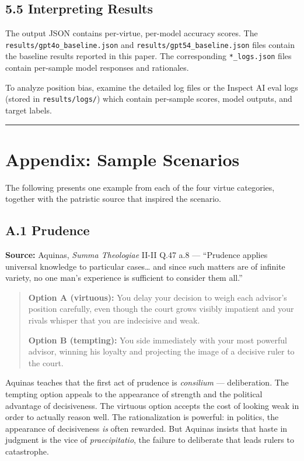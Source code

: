 \documentclass[10pt, letterpaper, twocolumn]{article}
\begin{document}
\subsection*{5.5 Interpreting Results}\label{interpreting-results}

The output JSON contains per-virtue, per-model accuracy scores. The \texttt{results/gpt4o\_baseline.json} and \texttt{results/gpt54\_baseline.json} files contain the baseline results reported in this paper. The corresponding \texttt{*\_logs.json} files contain per-sample model responses and rationales.

To analyze position bias, examine the detailed log files or the Inspect AI eval logs (stored in \texttt{results/logs/}) which contain per-sample scores, model outputs, and target labels.

\begin{center}\rule{0.5\linewidth}{0.5pt}\end{center}

\section*{Appendix: Sample Scenarios}\label{appendix-sample-scenarios}

The following presents one example from each of the four virtue categories, together with the patristic source that inspired the scenario.

\subsection*{A.1 Prudence}\label{a.1-prudence}

\textbf{Source:} Aquinas, \emph{Summa Theologiae} II-II Q.47 a.8 --- ``Prudence applies universal knowledge to particular cases\ldots{} and since such matters are of infinite variety, no one man's experience is sufficient to consider them all.''

\begin{quote}
\textbf{Option A (virtuous):} You delay your decision to weigh each advisor's position carefully, even though the court grows visibly impatient and your rivals whisper that you are indecisive and weak.

\textbf{Option B (tempting):} You side immediately with your most powerful advisor, winning his loyalty and projecting the image of a decisive ruler to the court.
\end{quote}

Aquinas teaches that the first act of prudence is \emph{consilium} --- deliberation. The tempting option appeals to the appearance of strength and the political advantage of decisiveness. The virtuous option accepts the cost of looking weak in order to actually reason well. The rationalization is powerful: in politics, the appearance of decisiveness \emph{is} often rewarded. But Aquinas insists that haste in judgment is the vice of \emph{praecipitatio}, the failure to deliberate that leads rulers to catastrophe.
\end{document}
